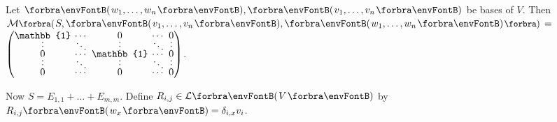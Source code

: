 Let $\Par{w_1,\dots,w_n},\Par{v_1,\dots,v_n}$ be bases of $V.$ Then $\Mt[\BigPar]{S,\Par{v_1,\dots,v_n},\Par{w_1,\dots,w_n}}\,=\,${\small$\begin{pmatrix} \mathbb{1} &\hspace{-6pt} \cdots &\hspace{-6pt} 0 &\hspace{-6pt} \cdots &\hspace{-6pt} 0\\[-6pt]
\vdots &\hspace{-6pt} \ddots &\hspace{-6pt} \vdots &\hspace{-6pt} \ddots &\hspace{-6pt} \vdots\\[-6pt]
0 &\hspace{-6pt} \cdots &\hspace{-6pt} \mathbb{1} &\hspace{-6pt} \cdots &\hspace{-6pt} 0\\[-6pt]
\vdots &\hspace{-6pt} \ddots &\hspace{-6pt} \vdots &\hspace{-6pt} \ddots &\hspace{-6pt} \vdots\\[-6pt]
0 &\hspace{-6pt} \cdots &\hspace{-6pt} 0 &\hspace{-6pt} \cdots &\hspace{-6pt} 0\end{pmatrix}$}.\vspace{-16pt}\par\quad
Now $S=E_{1,1}+\dots+E_{m,m}.$ Define $R_{i,j}\in\Lm{V}$ by $R_{i,j}\Par{w_x}=\delta_{i,x} v_i$.\par\quad

